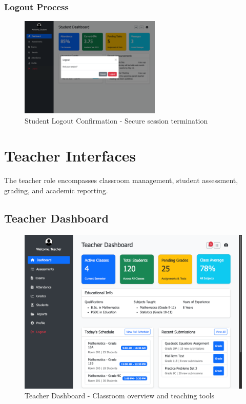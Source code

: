 \documentclass[12pt,a4paper]{article}
\begin{document}
\subsubsection{Logout Process}
\begin{figure}[H]
    \centering
    \includegraphics[width=0.6\textwidth]{student/student-logout.png}
    \caption{Student Logout Confirmation - Secure session termination}
    \label{fig:student-logout}
\end{figure}

\section{Teacher Interfaces}

The teacher role encompasses classroom management, student assessment, grading, and academic reporting.

\subsection{Teacher Dashboard}
\begin{figure}[H]
    \centering
    \includegraphics[width=\textwidth]{teacher/teacher-dashboard-page.png}
    \caption{Teacher Dashboard - Classroom overview and teaching tools}
    \label{fig:teacher-dashboard}
\end{figure}
\end{document}

